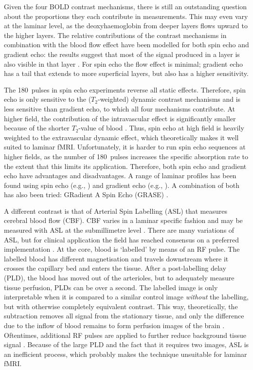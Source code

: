 Given the four BOLD contrast mechanisms, there is still an outstanding question about the proportions they each contribute in measurements. This may even vary at the laminar level, as the deoxyhaemoglobin from deeper layers flows upward to the higher layers. The relative contributions of the contrast mechanisms in combination with the blood flow effect have been modelled for both spin echo and gradient echo: the results suggest that most of the signal produced in a layer is also visible in that layer \cite{Markuerkiaga2016,Uludag2017}. For spin echo the flow effect is minimal; gradient echo has a tail that extends to more superficial layers, but also has a higher sensitivity.

The 180\textdegree~pulses in spin echo experiments reverse all static effects. Therefore, spin echo is only sensitive to the ($T_2$-weighted) dynamic contrast mechanisms and is less sensitive than gradient echo, to which all four mechanisms contribute. At higher field, the contribution of the intravascular effect is significantly smaller because of the shorter $T_2$-value of blood \cite{Norris2006}. Thus, spin echo at high field is heavily weighted to the extravascular dynamic effect, which theoretically makes it well suited to laminar fMRI. Unfortunately, it is harder to run spin echo sequences at higher fields, as the number of 180\textdegree~pulses increases the specific absorption rate to the extent that this limits its application. Therefore, both spin echo and gradient echo have advantages and disadvantages. A range of laminar profiles has been found using spin echo (e.g., \cite{Zhao2004,Harel2006,Goense2006}) and gradient echo (e.g., \cite{Polimeni2010,DeMartino2013,Chen2013}). A combination of both has also been tried: GRadient A Spin Echo (GRASE) \cite{Olman2012,DeMartino2013}.

A different contrast is that of Arterial Spin Labelling (ASL) \cite{Williams1992,Detre1994} that measures cerebral blood flow (CBF). CBF varies in a laminar specific fashion \cite{Gerrits2000} and may be measured with ASL at the submillimetre level \cite{Ivanov2016}. There are many variations of ASL, but for clinical application the field has reached consensus on a preferred implementation \cite{Alsop2015}. At the core, blood is `labelled' by means of an RF pulse. The labelled blood has different magnetisation and travels downstream where it crosses the capillary bed and enters the tissue. After a post-labelling delay (PLD), the blood has moved out of the arterioles, but to adequately measure tissue perfusion, PLDs can be over a second. The labelled image is only interpretable when it is compared to a similar control image \emph{without} the labelling, but with otherwise completely equivalent contrast. This way, theoretically, the subtraction removes all signal from the stationary tissue, and only the difference due to the inflow of blood remains to form perfusion images of the brain \cite{Petcharunpaisan2010}. Oftentimes, additional RF pulses are applied to further reduce background tissue signal \cite{Garcia2005,Grade2015}. Because of the large PLD and the fact that it requires two images, ASL is an inefficient process, which probably makes the technique unsuitable for laminar fMRI.


